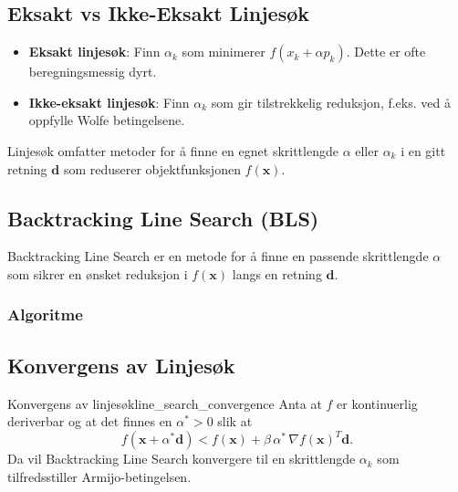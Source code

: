 \subsection{Eksakt vs Ikke-Eksakt Linjesøk}

\begin{itemize}
  \item \textbf{Eksakt linjesøk}: Finn $\alpha_k$ som minimerer $f(x_k + \alpha p_k)$. Dette er ofte beregningsmessig dyrt.
  \item \textbf{Ikke-eksakt linjesøk}: Finn $\alpha_k$ som gir tilstrekkelig reduksjon, f.eks. ved å oppfylle Wolfe betingelsene.
\end{itemize}

Linjesøk omfatter metoder for å finne en egnet skrittlengde \(\alpha\) eller \(\alpha_k\) i en gitt retning \(\symbf{d}\) som reduserer objektfunksjonen \(f(\symbf{x})\).

\subsection{Backtracking Line Search (BLS)}
Backtracking Line Search er en metode for å finne en passende skrittlengde \(\alpha\) som sikrer en ønsket reduksjon i \(f(\symbf{x})\) langs en retning \(\symbf{d}\).

\subsubsection{Algoritme}
\begin{algorithm}[H]
  \SetAlgoLined
  \caption{Backtracking Line Search (BLS)}
  \label{alg:backtracking_line_search}
\end{algorithm}

\subsection{Konvergens av Linjesøk}
\begin{theorem}{Konvergens av linjesøk}{line_search_convergence}
  Anta at \(f\) er kontinuerlig deriverbar og at det finnes en \(\alpha^* > 0\) slik at
  \[
    f(\symbf{x} + \alpha^* \symbf{d}) < f(\symbf{x}) + \beta\,\alpha^*\,\nabla f(\symbf{x})^T \symbf{d}.
  \]
  Da vil Backtracking Line Search konvergere til en skrittlengde \(\alpha_k\) som tilfredsstiller Armijo-betingelsen.
\end{theorem}

